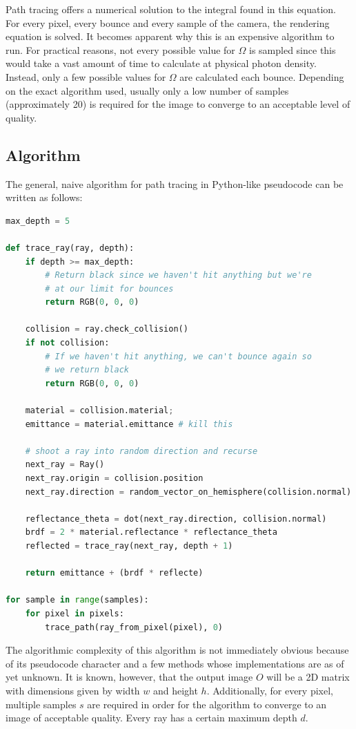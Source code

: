 \documentclass[
  twoside,
  11pt, a4paper,
  footinclude=true,
  headinclude=true,
  cleardoublepage=empty
]{scrreprt}
\begin{document}
Path tracing offers a numerical solution to the integral found in this equation. For every pixel,
every bounce and every sample of the camera, the rendering equation is solved. It becomes apparent
why this is an expensive algorithm to run. For practical reasons, not every possible value for
\(\Omega\) is sampled since this would take a vast amount of time to calculate at physical photon
density. Instead, only a few possible values for \(\Omega\) are calculated each bounce. Depending
on the exact algorithm used, usually only a low number of samples (approximately 20) is required for the
image to converge to an acceptable level of quality.

\subsection{Algorithm}
The general, naive algorithm for path tracing in Python-like pseudocode can be written as follows:

\begin{lstlisting}[language=Python]
max_depth = 5

def trace_ray(ray, depth):
    if depth >= max_depth:
        # Return black since we haven't hit anything but we're
        # at our limit for bounces
        return RGB(0, 0, 0) 

    collision = ray.check_collision()
    if not collision:
        # If we haven't hit anything, we can't bounce again so
        # we return black
        return RGB(0, 0, 0)

    material = collision.material;
    emittance = material.emittance # kill this

    # shoot a ray into random direction and recurse
    next_ray = Ray()
    next_ray.origin = collision.position
    next_ray.direction = random_vector_on_hemisphere(collision.normal)

    reflectance_theta = dot(next_ray.direction, collision.normal)
    brdf = 2 * material.reflectance * reflectance_theta
    reflected = trace_ray(next_ray, depth + 1)

    return emittance + (brdf * reflecte)

for sample in range(samples):
    for pixel in pixels:
        trace_path(ray_from_pixel(pixel), 0)
\end{lstlisting}

The algorithmic complexity of this algorithm is not immediately obvious because of its pseudocode
character and a few methods whose implementations are as of yet unknown. It is known, however, that
the output image \(O\) will be a 2D matrix with dimensions given by width \(w\) and height \(h\).
Additionally, for every pixel, multiple samples \(s\) are required in order for the algorithm to
converge to an image of acceptable quality. Every ray has a certain maximum depth \(d\).
\end{document}
